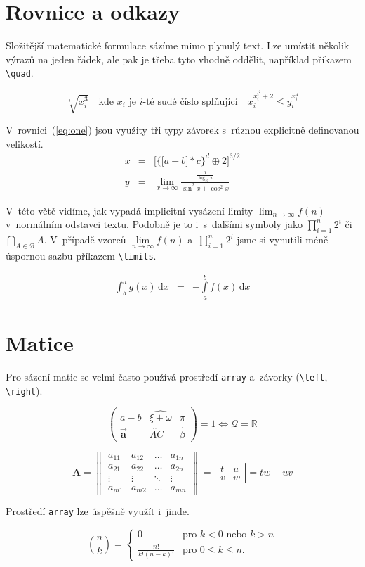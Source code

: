 \documentclass[a4paper, 11pt, twocolumn]{article}
\begin{document}
\section{Rovnice a odkazy}
Složitější matematické formulace sázíme mimo plynulý
text. Lze umístit několik výrazů na jeden řádek, ale pak je třeba tyto vhodně oddělit, například příkazem \verb|\quad|.

\[\sqrt[i]{x^3_i}\quad\text{kde } x_i \text{ je } i\text{-té sudé číslo splňující}\quad x_i^{x_i^{i^2}+2}\leq y_i^{x_i^4}\]

V~rovnici~(\ref{eq:one}) jsou využity tři typy závorek s~různou
explicitně definovanou velikostí.
\begin{eqnarray}
    x &=& \bigg[\Big\{\big[a+b\big]*c\Big\}^d\oplus2\bigg]^{3/2}\label{eq:one} \\
    y &=& \lim_{x\to\infty} \frac{\frac{1}{\log_{10}x}}{\sin^2x + \cos^2x} \nonumber
\end{eqnarray}

V~této větě vidíme, jak vypadá implicitní vysázení limity $\lim_{n\to\infty} f(n)$ v~normálním odstavci textu. Podobně je to i~s~dalšími symboly jako $\prod_{i=1}^n 2^i$ či $\bigcap_{A \in \mathcal{B}}A$. V~případě vzorců $\lim\limits_{n\to\infty} f(n)$ a~$\prod\limits_{i=1}^n 2^i$ jsme si vynutili méně úspornou sazbu příkazem \verb|\limits|.

\begin{eqnarray}
    \int_b^a g(x)\,\mathrm{d}x &=& -\int\limits_a^b f(x)\,\mathrm{d}x
\end{eqnarray}

\section{Matice}
Pro sázení matic se velmi často používá prostředí \texttt{array} a~závorky (\verb|\left|, \verb|\right|).

\[\left( \begin{array}{ccc}
a-b & \widehat{\xi+\omega} & \pi \\
\vec{\mathbf{a}} & \overleftrightarrow{AC} & \hat{\beta}
\end{array} \right) = 1 \Longleftrightarrow \mathcal{Q} = \mathbb{R}\]

\[ \mathbf{A} = \left\|\begin{array}{cccc}
a_{11} & a_{12} & \dots & a_{1n} \\
a_{21} & a_{22} & \dots & a_{2n} \\
\vdots & \vdots & \ddots & \vdots \\
a_{m1} & a_{m2} & \hdots & a_{mn}
\end{array}\right\| = 
\left|\begin{array}{rl}
t & u \\
v & w
\end{array}\right| = tw - uv\]

Prostředí \texttt{array} lze úspěšně využít i~jinde.

\[\binom{n}{k} = \left\{\begin{array}{cl}
0   & \text{pro } k < 0 \text{ nebo } k > n \\
\frac{n!}{k!(n-k)!} & \text{pro } 0 \leq k \leq n.
\end{array}\right.\]
\end{document}
